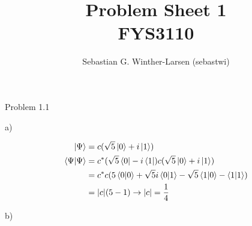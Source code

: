 \documentclass{article}
\title{Problem Sheet 1 \\
\large{FYS3110}}
\author{Sebastian G. Winther-Larsen (sebastwi)}
\begin{document}
\maketitle

Problem 1.1

\hspace{1cm}

a)

\begin{align*}
\ket{\Psi} 		&= c(\sqrt{5}\ket{0}+i\ket{1})\\
\braket{\Psi} 	&= c^*(\sqrt{5}\bra{0}-i\bra{1}) c(\sqrt{5}\ket{0}+i\ket{1})\\
				&= c^*c(5\braket{0}+\sqrt{5}i\braket{0}{1}-\sqrt{5}\braket{1}{0}-\braket{1})\\
				&= \abs{c}(5-1) \rightarrow \abs{c}=\frac{1}{4}
\end{align*}

\hspace{1cm}

b)
\end{document}

